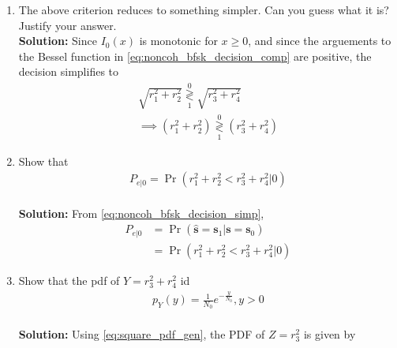 \documentclass[journal,8pt,onecolumn]{IEEEtran}
\providecommand{\pr}[1]{\ensuremath{\Pr\left(#1\right)}}
\providecommand{\brak}[1]{\ensuremath{\left(#1\right)}}
\newcommand{\solution}{\noindent \textbf{Solution: }}
\providecommand{\dec}[2]{\ensuremath{\overset{#1}{\underset{#2}{\gtrless}}}}
\let\vec\mathbf
\begin{document}
\begin{enumerate}
\begin{enumerate}[label=(\alph{enumii})]
\solution The PDF of $\vec{r}|1$ has a similar form to \eqref{eq:noncoh_bfsk_pdf},
\begin{equation}
	p\brak{\mathbf{r}|1} = \frac{1}{N_0^2\pi^2}e^{-\frac{r_1^2+r_2^2+r_3^2+r_4^2+E_b}{N_0}}I_{0}\brak{\frac{2\sqrt{E_b}}{N_0}\sqrt{r_3^2+r_4^2}}
	\label{eq:noncoh_bfsk_pdf_one}
\end{equation}
From \eqref{eq:noncoh_bfsk_pdf} and \eqref{eq:noncoh_bfsk_pdf_one},
\begin{align}
	p\brak{\mathbf{r}|0} &=  f(\vec{r}) I_{0}\brak{k\sqrt{r_1^2+r_2^2}}\\
	p\brak{\mathbf{r}|1} &=  f(\vec{r}) I_{0}\brak{k\sqrt{r_3^2+r_4^2}}
\end{align}
Using the MLE rule from \eqref{eq:mle_rule}, the optimum decision is given by
\begin{align}
I_0\brak{k\sqrt{r_1^2+r_2^2}}\dec{0}{1}I_0\brak{k\sqrt{r_3^2+r_4^2}}
\end{align}
%
\item 
The above criterion reduces to something simpler.  Can you guess what it is?  Justify your answer.\\
\solution Since $I_{0}(x)$ is monotonic for $x \ge 0$, and since the arguements to the Bessel function in \eqref{eq:noncoh_bfsk_decision_comp} %
are positive, the decision simplifies to
\begin{align}
	\nonumber
	\sqrt{r_1^2+r_2^2}\dec{0}{1}\sqrt{r_3^2+r_4^2}\\
	\label{eq:noncoh_bfsk_decision_simp}
	\implies \brak{r_1^2+r_2^2}\dec{0}{1}\brak{r_3^2+r_4^2}
\end{align}
%
\item 
Show that 
%
\begin{align}
P_{e|0}=\pr{r_1^2+r_2^2 < r_3^2+r_4^2 | 0}
\end{align}\\
\solution From \eqref{eq:noncoh_bfsk_decision_simp},
\begin{align}
P_{e|0} &= \pr{\hat{\vec{s}} = \vec{s}_1 | \vec{s} = \vec{s}_0}\\
	&=\pr{r_1^2+r_2^2 < r_3^2+r_4^2 | 0}
\end{align}
%
\item 
Show that the pdf of $Y=r_3^2+r_4^2$ id
%
\begin{align}
\label{eq:noncoh_bfsk_r34sq_pdf}
p_{Y}(y) = \frac{1}{N_0}e^{-\frac{y}{N_0}}, y > 0
\end{align}\\
\solution Using \eqref{eq:square_pdf_gen}, the PDF of $Z=r_3^2$ is given by

\end{enumerate}
\end{enumerate}
\end{document}
